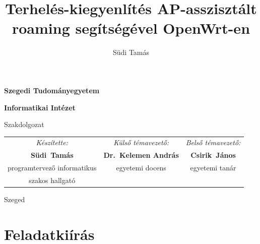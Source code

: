 \documentclass[12pt]{article}
\author{Südi Tamás}
\title{Terhelés-kiegyenlítés AP-asszisztált roaming segítségével OpenWrt-en}
\begin{document}

\pagestyle{fancy}
\fancyhf{}
\fancyhead[L]{\@title}
\fancyfoot[R]{\thepage}


\thispagestyle{empty}

\begin{center}
\vspace*{1cm}
{\Large\bf Szegedi Tudományegyetem}

\vspace{0.5cm}

{\Large\bf Informatikai Intézet}

\vspace*{3.8cm}


{\LARGE\bf \@title}


\vspace*{3.6cm}

{\Large Szakdolgozat}

\vspace*{4cm}

{\begin{center}
  \begin{tabular}{ccc}
  \emph{Készítette:} & \emph{Külső témavezető:} & \emph{Belső témavezető:}\\
  \bf{Südi\ Tamás} & \bf{Dr.\ Kelemen András} & \bf{Csirik\ János}\\
  programtervező informatikus & egyetemi docens & egyetemi tanár\\
  szakos hallgató
  \end{tabular}
\end{center}}

\vspace*{2.3cm}

{\Large
Szeged
\\
\vspace{2mm}
\the\year{}
}
\end{center}


\tableofcontents

\section*{Feladatkiírás}
\end{document}
